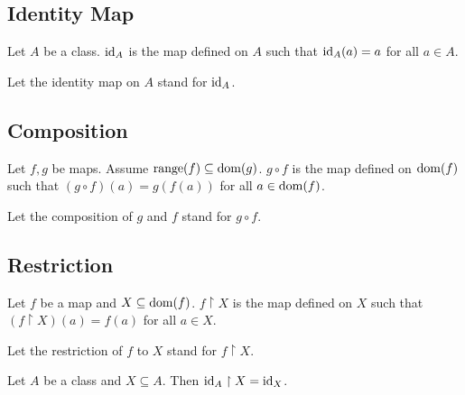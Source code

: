\documentclass[10pt]{article}
\begin{document}
  \subsection*{Identity Map}

  \begin{forthel}
    \begin{definition}[id=FOUNDATIONS_06_1920902360989696,printid]
      Let $A$ be a class.
      $\textrm{id}_{A}$ is the map defined on $A$ such that $\textrm{id}_{A}(a) = a$ for all $a \in A$.
    \end{definition}

    Let the identity map on $A$ stand for $\textrm{id}_{A}$.
  \end{forthel}


  \subsection*{Composition}

  \begin{forthel}
    \begin{definition}[id=FOUNDATIONS_06_7605717729017856,printid]
      Let $f, g$ be maps.
      Assume $\textrm{range}(f) \subseteq \operatorname{dom}(g)$.
      $g \circ f$ is the map defined on $\operatorname{dom}(f)$ such that $(g \circ f)(a) = g(f(a))$ for all $a \in \operatorname{dom}(f)$.
    \end{definition}

    Let the composition of $g$ and $f$ stand for $g \circ f$.
  \end{forthel}


  \subsection*{Restriction}

  \begin{forthel}
    \begin{definition}[id=FOUNDATIONS_06_7095412741636096,printid]
      Let $f$ be a map and $X \subseteq \operatorname{dom}(f)$.
      $f \restriction X$ is the map defined on $X$ such that $(f \restriction X)(a) = f(a)$ for all $a \in X$.
    \end{definition}

    Let the restriction of $f$ to $X$ stand for $f \restriction X$.
  \end{forthel}

  \begin{forthel}
    \begin{proposition}[id=FOUNDATIONS_06_2170189258948608,printid]
      Let $A$ be a class and $X \subseteq A$.
      Then $\textrm{id}_{A} \restriction X = \textrm{id}_{X}$.
    \end{proposition}
  \end{forthel}
\end{document}
